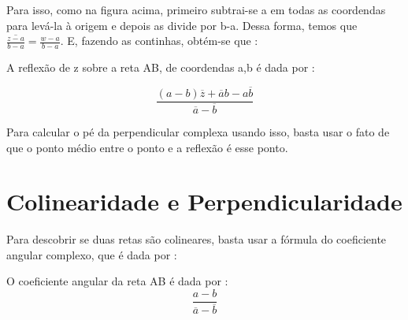 \documentclass{article}
\begin{document}

Para isso, como na figura acima, primeiro subtrai-se a em  todas as coordendas para levá-la à origem e depois as divide por b-a. Dessa forma, temos que $\overline{\frac{z-a}{b-a}} = \frac{w-a}{b-a}$. E, fazendo as continhas, obtém-se que : 


\begin{tcolorbox}[colback=blue!5!white,colframe=blue!75!black,title=Reflexão Complexa\emoji{nerd-face}]
A reflexão de z sobre a reta AB, de coordendas a,b é dada por : 

$$\frac{(a-b) \overline{z} + \overline{a}b - a \overline{b}}{\overline{a}- \overline{b}}$$

\end{tcolorbox}

Para calcular o pé da perpendicular complexa usando isso, basta usar o fato de que o ponto médio entre o ponto e a reflexão é esse ponto.

\section{Colinearidade e Perpendicularidade}

Para descobrir se duas retas são colineares, basta usar a fórmula do coeficiente angular complexo, que é dada por : 

\begin{tcolorbox}[colback=blue!5!white,colframe=blue!75!black,title=Coeficiente angular complexo\emoji{nerd-face}]
O coeficiente angular da reta AB é dada por : 
$$\frac{a-b}{\overline{a} - \overline{b}}$$

\end{tcolorbox}
\end{document}
